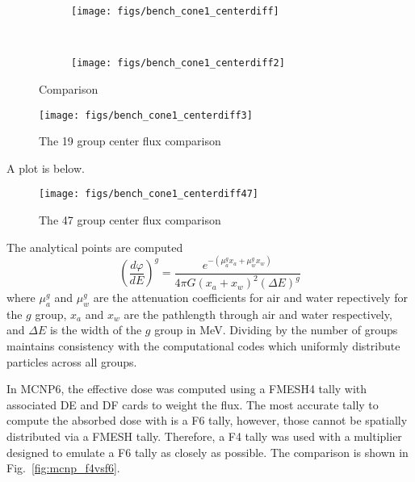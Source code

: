 \begin{figure}
    \centering
    \begin{subfigure}[b]{0.45\textwidth}
        \texttt{[image: figs/bench\_cone1\_centerdiff]}
        \caption{}
        \label{fig:bench_cone1_centerdiff}
    \end{subfigure}
    ~
    \begin{subfigure}[b]{0.45\textwidth}
        \texttt{[image: figs/bench\_cone1\_centerdiff2]}
        \caption{}
        \label{fig:bench_cone1_centerdiff2}
    \end{subfigure}
    \caption{Comparison}\label{fig:bench_cone1_centerdifffig}
\end{figure}

\begin{figure}[tb]
  \begin{center}
   \texttt{[image: figs/bench\_cone1\_centerdiff3]}
  \end{center}
  \caption{The 19 group center flux comparison}
\label{fig:bench_cone1_centerdiff3}
\end{figure}

A plot is below.

\begin{figure}[tb]
  \begin{center}
   \texttt{[image: figs/bench\_cone1\_centerdiff47]}
  \end{center}
  \caption{The 47 group center flux comparison}
\label{fig:bench_cone1_centerdiff47}
\end{figure}

The analytical points are computed
\begin{equation}
\left(\frac{d\varphi}{dE}\right)^g = \frac{e^{-(\mu^g_a x_a + \mu^g_w x_w)}}{4\pi G (x_a + x_w)^2 (\Delta E)^g}
\end{equation}
where $\mu_a^g$ and $\mu_w^g$ are the attenuation coefficients for air and water repectively for the $g$ group, $x_a$ and $x_w$ are the pathlength through air and water respectively, and $\Delta E$ is the width of the $g$ group in MeV. Dividing by the number of groups maintains consistency with the computational codes which uniformly distribute particles across all groups.

In MCNP6, the effective dose was computed using a FMESH4 tally with associated DE and DF cards to weight the flux. The most accurate tally to compute the absorbed dose with is a F6 tally, however, those cannot be spatially distributed via a FMESH tally. Therefore, a F4 tally was used with a multiplier designed to emulate a F6 tally as closely as possible. The comparison is shown in Fig.~\ref{fig:mcnp_f4vsf6}.

